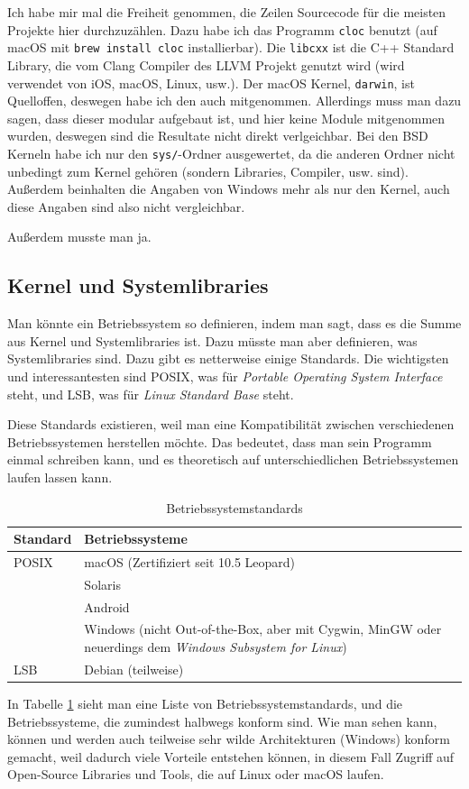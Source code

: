 \documentclass[ngerman,abstract=true]{scrartcl}
\newcommand{\tablespacing}[1]{\renewcommand{\arraystretch}{#1}}
\begin{document}
\begin{anmerkung}
Ich habe mir mal die Freiheit genommen, die Zeilen Sourcecode für die meisten Projekte hier durchzuzählen. Dazu habe ich das Programm \verb|cloc| benutzt (auf macOS mit \verb|brew install cloc| installierbar). Die \verb|libcxx| ist die C++ Standard Library, die vom Clang Compiler des LLVM Projekt genutzt wird (wird verwendet von iOS, macOS, Linux, usw.). Der macOS Kernel, \verb|darwin|, ist Quelloffen, deswegen habe ich den auch mitgenommen. Allerdings muss man dazu sagen, dass dieser modular aufgebaut ist, und hier keine Module mitgenommen wurden, deswegen sind die Resultate nicht direkt verlgeichbar. Bei den BSD Kerneln habe ich nur den \verb|sys/|-Ordner ausgewertet, da die anderen Ordner nicht unbedingt zum Kernel gehören (sondern Libraries, Compiler, usw. sind). Außerdem beinhalten die Angaben von Windows mehr als nur den Kernel, auch diese Angaben sind also nicht vergleichbar. 
\end{anmerkung}


Außerdem musste man ja.

\subsection{Kernel und Systemlibraries}

Man könnte ein Betriebssystem so definieren, indem man sagt, dass es die Summe aus Kernel und Systemlibraries ist. Dazu müsste man aber definieren, was Systemlibraries sind. Dazu gibt es netterweise einige Standards. Die wichtigsten und interessantesten sind POSIX, was für \emph{Portable Operating System Interface} steht, und LSB, was für \emph{Linux Standard Base} steht.

Diese Standards existieren, weil man eine Kompatibilität zwischen verschiedenen Betriebssystemen herstellen möchte. Das bedeutet, dass man sein Programm einmal schreiben kann, und es theoretisch auf unterschiedlichen Betriebssystemen laufen lassen kann. 
\begin{table}[h]\centering\tablespacing{1.3}
\begin{tabular}{@{}lp{10cm}@{}}
\toprule
\textbf{Standard} & \textbf{Betriebssysteme}\\
\midrule
POSIX 
  & macOS (Zertifiziert seit 10.5 Leopard)\\
  & Solaris\\
  & Android\\
  & Windows (nicht Out-of-the-Box, aber mit Cygwin, MinGW oder neuerdings dem \emph{Windows Subsystem for Linux})\\
LSB
  & Debian (teilweise)\\
\bottomrule
\end{tabular}
\caption{Betriebssystemstandards}\label{tbl:osstd}
\end{table}
In Tabelle \ref{tbl:osstd} sieht man eine Liste von Betriebssystemstandards, und die Betriebssysteme, die zumindest halbwegs konform sind. Wie man sehen kann, können und werden auch teilweise sehr wilde Architekturen (Windows) konform gemacht, weil dadurch viele Vorteile entstehen können, in diesem Fall Zugriff auf Open-Source Libraries und Tools, die auf Linux oder macOS laufen.
\end{document}
